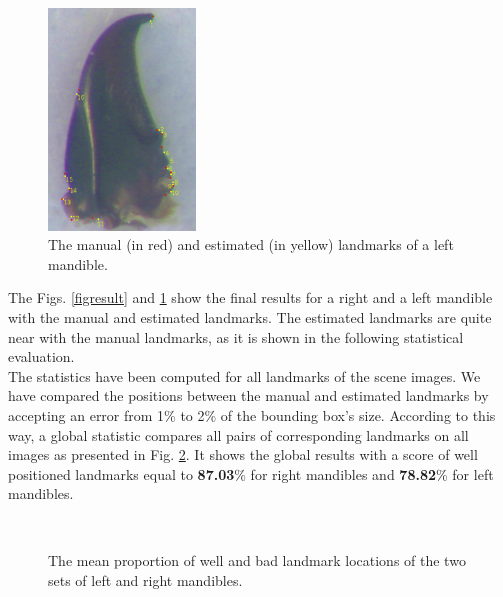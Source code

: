 \documentclass[twoside,twocolumn,10pt]{article}
\begin{document}
\begin{figure}[h]
\centering
\includegraphics[width=0.35\textwidth]{./images/mg_rs}
\caption{The manual (in red) and estimated (in yellow) landmarks of a left mandible.}
\label{figresult2}
\end{figure}

The Figs. \ref{figresult} and \ref{figresult2} show the final results
for a right and a left mandible with the manual and estimated
landmarks. The estimated landmarks are quite near with the manual
landmarks, as it is shown in the following statistical evaluation.
\\
The statistics have been computed for all landmarks of the scene images.
We have compared the positions between the manual and estimated
landmarks by accepting an error from 1\% to 2\% of the bounding box's
size. According to this way, a global statistic compares all pairs of
corresponding landmarks on all images as presented in
Fig. \ref{figctresult}. It shows the global results with a score of
well positioned landmarks equal to \textbf{87.03}\% for right
mandibles and \textbf{78.82}\% for left mandibles.

\begin{figure}[h]
\centering
{}~~
\caption{The mean proportion of well and bad landmark locations of the two sets of left and right mandibles.}
\label{figctresult}
\end{figure}
\end{document}

